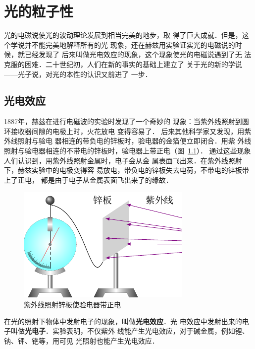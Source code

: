 \chapter{光的粒子性}\label{chapter-particle-nature-of-light}

光的电磁说使光的波动理论发展到相当完美的地步，取
得了巨大成就．但是，这个学说并不能完美地解释所有的光
现象，还在赫兹用实验证实光的电磁说的时候，就已经发现了
后来叫做光电效应的现象，这个现象使光的电磁说遇到了无
法克服的困难．二十世纪初，人们在新的事实的基础上建立了
关于光的新的学说——光子说，对光的本性的认识又前进了
一步．


\section{光电效应}
1887年，赫兹在进行电磁波的实验时发现了一个奇妙的
现象：当紫外线照射到圆环接收器间隙的电极上时，火花放电
变得容易了．
后来其他科学家又发现，用紫外线照射与验电
器相连的带负电的锌板时，验电器的金箔便立即闭合．用紫
外线照射与验电器相连的不带电的锌板时，验电器上带正电（图~\ref{fig_C_7-1}）．
通过这些现象人们认识到，用紫外线照射金属时，电子会从金
属表面飞出来．在紫外线照射下，赫兹实验中的电极变得容
易放电，带负电的锌板失去电荷，不带电的锌板带上了正电，
都是由于电子从金属表面飞出来了的缘故．
\begin{figure}[htbp]
    \centering
    \includegraphics{fig/C/7-1.pdf}
    \caption{紫外线照射锌板使验电器带正电}\label{fig_C_7-1}
\end{figure}

在光的照射下物体中发射电子的现象，叫做\textbf{光电效应}．光
电效应中发射出来的电子叫做\textbf{光电子}．实验表明，不仅紫外
线能产生光电效应，对于碱金属，例如锂、钠、钾、铯等，用可见
光照射也能产生光电效应．



